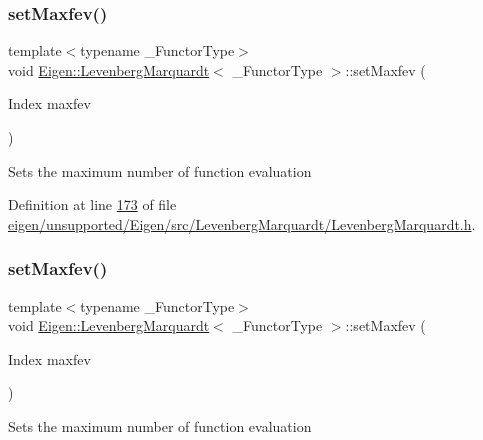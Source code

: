 \subsubsection{\texorpdfstring{set\+Maxfev()}{setMaxfev()}\hspace{0.1cm}{\footnotesize\ttfamily [1/2]}}
{\footnotesize\ttfamily template$<$typename \+\_\+\+Functor\+Type$>$ \\
void \hyperlink{class_eigen_1_1_levenberg_marquardt}{Eigen\+::\+Levenberg\+Marquardt}$<$ \+\_\+\+Functor\+Type $>$\+::set\+Maxfev (\begin{DoxyParamCaption}\item[{Index}]{maxfev }\end{DoxyParamCaption})\hspace{0.3cm}{\ttfamily [inline]}}

Sets the maximum number of function evaluation 

Definition at line \hyperlink{eigen_2unsupported_2_eigen_2src_2_levenberg_marquardt_2_levenberg_marquardt_8h_source_l00173}{173} of file \hyperlink{eigen_2unsupported_2_eigen_2src_2_levenberg_marquardt_2_levenberg_marquardt_8h_source}{eigen/unsupported/\+Eigen/src/\+Levenberg\+Marquardt/\+Levenberg\+Marquardt.\+h}.

\mbox{\label{class_eigen_1_1_levenberg_marquardt_af072d0f89c44415d8ed284df8b4a634a}} 
\subsubsection{\texorpdfstring{set\+Maxfev()}{setMaxfev()}\hspace{0.1cm}{\footnotesize\ttfamily [2/2]}}
{\footnotesize\ttfamily template$<$typename \+\_\+\+Functor\+Type$>$ \\
void \hyperlink{class_eigen_1_1_levenberg_marquardt}{Eigen\+::\+Levenberg\+Marquardt}$<$ \+\_\+\+Functor\+Type $>$\+::set\+Maxfev (\begin{DoxyParamCaption}\item[{Index}]{maxfev }\end{DoxyParamCaption})\hspace{0.3cm}{\ttfamily [inline]}}

Sets the maximum number of function evaluation 

